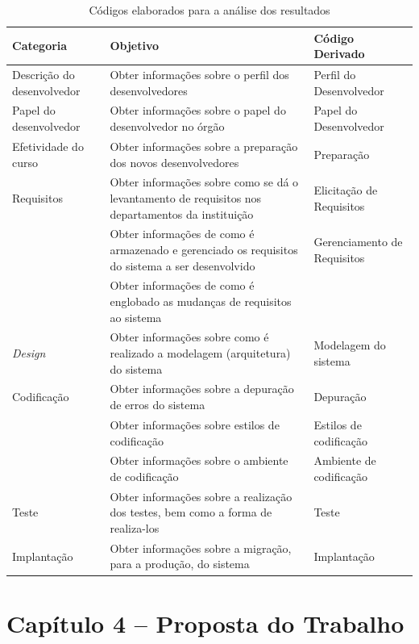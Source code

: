\begin{table}[h]
	\centering
	\begin{tabular}{|m{4.8cm} | m{4.8cm} | m{4.8cm}|}
		\hline
		\textbf{Categoria} & \textbf{Objetivo} & 
		\textbf{Código Derivado} \\ \hline
		Descrição do desenvolvedor & Obter informações sobre o perfil dos desenvolvedores & 
		Perfil do Desenvolvedor \\ \hline
		Papel do desenvolvedor & Obter informações sobre o papel do desenvolvedor no órgão & 
		Papel do Desenvolvedor \\ \hline 
		Efetividade do curso & Obter informações sobre a preparação dos novos desenvolvedores & 
		Preparação \\ \hline 
		Requisitos & Obter informações sobre como se dá o levantamento de requisitos nos departamentos da instituição & Elicitação de Requisitos \\ \cline{2-3}
		& Obter informações de como é armazenado e gerenciado os requisitos do sistema a ser desenvolvido &
		 Gerenciamento de Requisitos \\ \cline{2-2}
		& Obter informações de como é englobado as mudanças de requisitos ao sistema & \\ \hline
		\textit{Design} & Obter informações sobre como é realizado a modelagem (arquitetura) do sistema &
		Modelagem do sistema \\ \hline
		Codificação & Obter informações sobre a depuração de erros do sistema & Depuração \\ \cline{2-3}
		& Obter informações sobre estilos de codificação & Estilos de codificação \\ \cline{2-3}
		& Obter informações sobre o ambiente de codificação & Ambiente de codificação \\ \hline
		Teste & Obter informações sobre a realização dos testes, bem como a forma de realiza-los &
		Teste \\ \hline
		Implantação & Obter informações sobre a migração, para a produção, do sistema & Implantação \\
		\hline
	\end{tabular}

	\caption{Códigos elaborados para a análise dos resultados}
	\label{tab01}
\end{table}

\chapter[Metodologia]{Capítulo 4 – Proposta do Trabalho}

